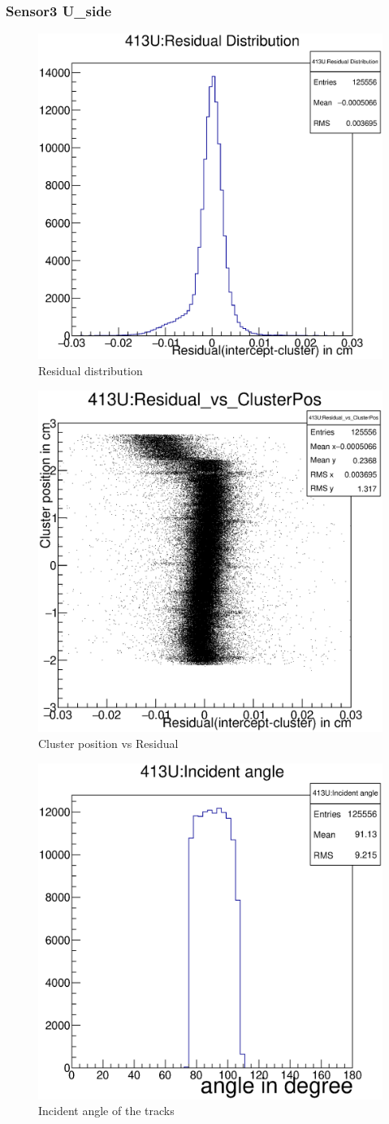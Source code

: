 \documentclass[12pt]{article}
\begin{document}
			\subsubsection{Sensor3 U\_side}
			\begin{multicols}{3}
				
				\begin{figure}[H]
					\includegraphics[width=.3\textwidth]{413U:residualplot.eps}	
					\caption{Residual distribution}	
					\label{fig1}	
				\end{figure}
				\begin{figure}[H]
					\includegraphics[width=.3\textwidth]{413U:residual_vs_clusterpos.eps}	
					\caption{Cluster position vs Residual}	
					\label{fig2}	
				\end{figure}
				\begin{figure}[H]
					\includegraphics[width=.3\textwidth]{413U:incident_angle.eps}	
					\caption{Incident angle of the tracks}	
					\label{fig2}	
				\end{figure}
			\end{multicols}
			
\end{document}
